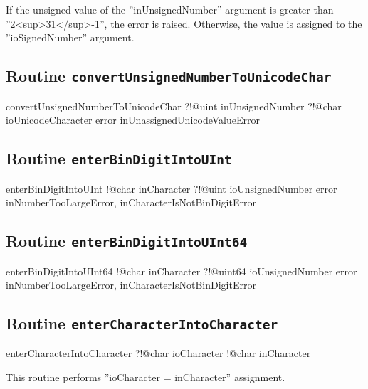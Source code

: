 If the unsigned value of the ''inUnsignedNumber'' argument is greater than ''2<sup>31</sup>-1'', the error is raised. Otherwise, the value is assigned to the ''ioSignedNumber'' argument.

\subsection{Routine \texttt{convertUnsignedNumberToUnicodeChar}}

\begin{galgas}
convertUnsignedNumberToUnicodeChar ?!@uint inUnsignedNumber
                                   ?!@char ioUnicodeCharacter
                                   error inUnassignedUnicodeValueError
\end{galgas}

\subsection{Routine \texttt{enterBinDigitIntoUInt}}

\begin{galgas}
enterBinDigitIntoUInt !@char inCharacter
                      ?!@uint ioUnsignedNumber
                      error inNumberTooLargeError,
                            inCharacterIsNotBinDigitError
\end{galgas}

\subsection{Routine \texttt{enterBinDigitIntoUInt64}}

\begin{galgas}
enterBinDigitIntoUInt64 !@char inCharacter
                        ?!@uint64 ioUnsignedNumber
                        error inNumberTooLargeError,
                              inCharacterIsNotBinDigitError
\end{galgas}

\subsection{Routine \texttt{enterCharacterIntoCharacter}}

\begin{galgas}
enterCharacterIntoCharacter ?!@char ioCharacter
                            !@char inCharacter
\end{galgas}

This routine performs ''ioCharacter = inCharacter'' assignment.

